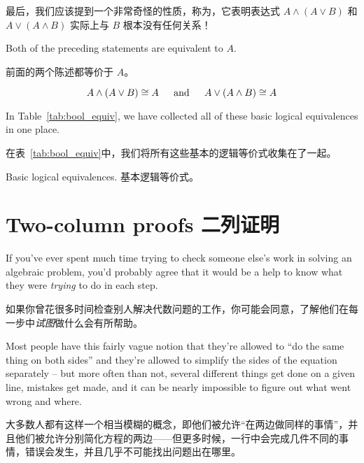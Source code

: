 最后，我们应该提到一个非常奇怪的性质，称为，它表明表达式 $A \land (A \lor B)$ 和 $A \lor (A \land B)$ 实际上与 $B$ 根本没有任何关系！

Both of the preceding
statements are equivalent to $A$.

前面的两个陈述都等价于 $A$。

\[ A \land (A \lor B) \cong A \mbox{\rule{12pt}{0pt} and \rule{12pt}{0pt}}%
A \lor (A \land B) \cong A \]

In Table~\ref{tab:bool_equiv}, we have collected all of these basic logical
equivalences in one place.

在表~\ref{tab:bool_equiv}中，我们将所有这些基本的逻辑等价式收集在了一起。

\begin{table}[hbt] 
\begin{center}

\end{center} 
\caption{Basic logical equivalences. 基本逻辑等价式。}
\label{tab:bool_equiv}
\end{table}

\clearpage




\newpage

\section{Two-column proofs 二列证明}
\label{sec:2_col}

If you've ever spent much time trying to check someone else's work
in solving an algebraic problem, you'd probably agree that it 
would be a help to know what they were \emph{trying} to do in each
step.

如果你曾花很多时间检查别人解决代数问题的工作，你可能会同意，了解他们在每一步中\emph{试图}做什么会有所帮助。

Most people have this fairly vague notion that they're allowed 
to ``do the same thing on both sides'' and they're allowed to simplify
the sides of the equation separately -- but more often than not, several
different things get done on a given line, mistakes get made, and it can
be nearly impossible to figure out what went wrong and where.

大多数人都有这样一个相当模糊的概念，即他们被允许“在两边做同样的事情”，并且他们被允许分别简化方程的两边——但更多时候，一行中会完成几件不同的事情，错误会发生，并且几乎不可能找出问题出在哪里。

